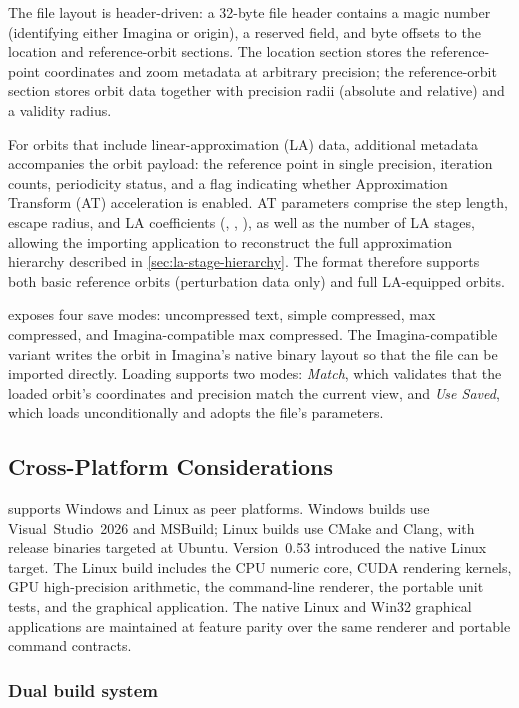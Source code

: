 The file layout is header-driven: a 32-byte file header
contains a magic number (identifying either Imagina or \FractalShark{} origin), a
reserved field, and byte offsets to the location and reference-orbit sections.
The location section stores the reference-point coordinates and zoom metadata at
arbitrary precision; the reference-orbit section stores orbit data together with
precision radii (absolute and relative) and a validity radius.

For orbits that include linear-approximation (LA) data, additional metadata
accompanies the orbit payload: the reference point in single precision,
iteration counts, periodicity status, and a flag indicating whether Approximation
Transform (AT) acceleration is enabled.  AT parameters comprise the step
length, escape radius, and LA coefficients (, ,
), as well as the number of LA stages, allowing the importing
application to reconstruct the full approximation hierarchy described in
\cref{sec:la-stage-hierarchy}.  The format therefore supports both basic
reference orbits (perturbation data only) and full LA-equipped orbits.

\FractalShark{} exposes four save modes: uncompressed text, simple compressed,
max compressed, and Imagina-compatible max compressed.  The Imagina-compatible
variant writes the orbit in Imagina's native binary layout so that the file can
be imported directly.  Loading supports two modes: \emph{Match}, which validates
that the loaded orbit's coordinates and precision match the current view, and
\emph{Use Saved}, which loads unconditionally and adopts the file's parameters.
\subsection{Cross-Platform Considerations}
\label{sec:cross-platform}

\FractalShark{} supports Windows and Linux as peer platforms. Windows builds use
Visual~Studio~2026 and MSBuild; Linux builds use CMake and Clang, with release
binaries targeted at Ubuntu. Version~0.53 introduced the native Linux target.
The Linux build includes the CPU numeric core, CUDA rendering kernels, GPU
high-precision arithmetic, the command-line renderer, the portable unit tests,
and the  graphical application. The native Linux and
Win32 graphical applications are maintained at feature parity over the same
renderer and portable command contracts.

\subsubsection{Dual build system}
\label{subsec:dual-build}

